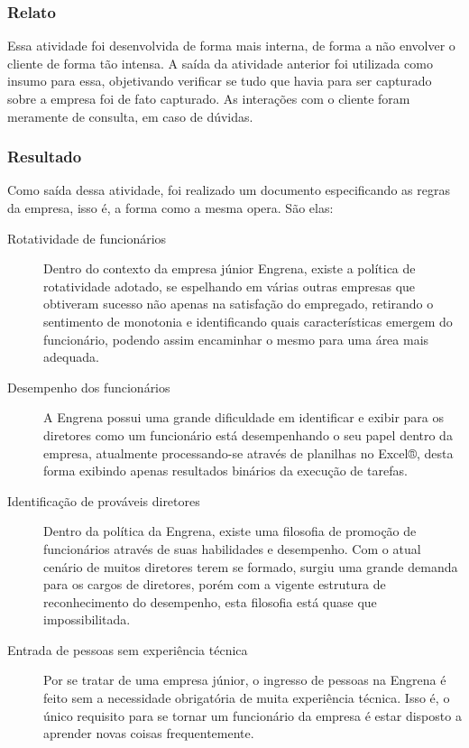 \subsubsection{Relato}
  Essa atividade foi desenvolvida de forma mais interna, de forma a não envolver o cliente de forma tão intensa. A saída da atividade anterior foi utilizada como insumo para essa, objetivando verificar se tudo que havia para ser capturado sobre a empresa foi de fato capturado. As interações com o cliente foram meramente de consulta, em caso de dúvidas.

  \subsubsection{Resultado}
    Como saída dessa atividade, foi realizado um documento especificando as regras da empresa, isso é, a forma como a mesma opera. São elas:

    \begin{description}
    \item [Rotatividade de funcionários] Dentro do contexto da empresa júnior Engrena, existe a política de rotatividade adotado, se espelhando em várias outras empresas que obtiveram sucesso não apenas na satisfação do empregado, retirando o sentimento de monotonia e identificando quais características emergem do funcionário, podendo assim encaminhar o mesmo para uma área mais adequada.

    \item [Desempenho dos funcionários] A Engrena possui uma grande dificuldade em identificar e exibir para os diretores como um funcionário está desempenhando o seu papel dentro da empresa, atualmente processando-se através de planilhas no Excel®, desta forma exibindo apenas resultados binários da execução de tarefas.

    \item [Identificação de prováveis diretores] Dentro da política da Engrena, existe uma filosofia de promoção de funcionários através de suas habilidades e desempenho. Com o atual cenário de muitos diretores terem se formado, surgiu uma grande demanda para os cargos de diretores, porém com a vigente estrutura de reconhecimento do desempenho, esta filosofia está quase que impossibilitada.

    \item [Entrada de pessoas sem experiência técnica] Por se tratar de uma empresa júnior, o ingresso de pessoas na Engrena é feito sem a necessidade obrigatória de muita experiência técnica. Isso é, o único requisito para se tornar um funcionário da empresa é estar disposto a aprender novas coisas frequentemente.

    \end{description}


